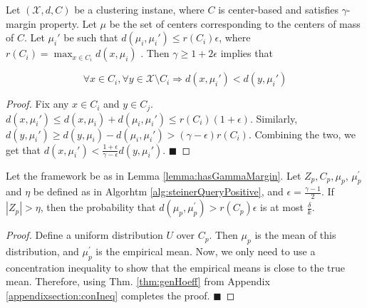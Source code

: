 \documentclass[orivec]{llncs}
\newcommand{\mc}{\mathcal}
\renewcommand{\qed}{\hfill\ensuremath{\blacksquare}}
\begin{document}
\begin{lemma}
\label{lemma:hasGammaMargin}
Let $(\mc X, d, C)$ be a clustering instane, where $C$ is center-based and satisfies $\gamma$-margin property. Let $\mu$ be the set of centers corresponding to the centers of mass of $C$. Let $\mu_i'$ be such that $d(\mu_i, \mu_i') \le r(C_i)\epsilon$, where $r(C_i) = \max_{x\in C_i}d(x, \mu_i)$ . Then $\gamma \ge 1 + 2\epsilon$ implies that 

$$\forall x \in C_i, \forall y \in {\mc X} \setminus C_i \Rightarrow d(x, \mu_i') < d(y, \mu_i')$$  
\end{lemma}


\begin{proof}
Fix any $x \in C_i$ and $y \in C_j$. $d(x, \mu_i') \le d(x, \mu_i)+d(\mu_i, \mu_i') \le r(C_i) (1+\epsilon)$. Similarly, $d(y, \mu_i') \ge d(y, \mu_i) - d(\mu_i, \mu_i') > (\gamma -\epsilon)r(C_i)$. Combining the two, we get that $d(x, \mu_i') < \frac{1+\epsilon}{\gamma-\epsilon}d(y, \mu_i')$. 
\qed
\end{proof}

\begin{lemma}
\label{lemma:phase1}
Let the framework be as in Lemma \ref{lemma:hasGammaMargin}. Let $Z_p, C_p, \mu_p$, $\mu_p^\prime$ and $\eta$ be defined as in Algorhtm \ref{alg:steinerQueryPositive}, and $\epsilon = \frac{\gamma - 1}{2}$. If $|Z_p| > \eta$, then the probability that $d(\mu_p, \mu_p^\prime) > r(C_p)\epsilon$ is at most $\frac{\delta}{k}$.
\end{lemma}
\begin{proof}
Define a uniform distribution $U$ over $C_p$. Then $\mu_p$ is the mean of this distribution, and $\mu_p^\prime$ is the empirical mean. Now, we only need to use a concentration inequality to show that the empirical means is close to the true mean. Therefore, using Thm. \ref{thm:genHoeff} from Appendix \ref{appendixsection:conIneq} completes the proof.
\qed
\end{proof}
\end{document}
